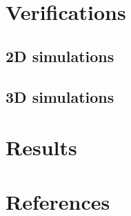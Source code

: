\documentclass[a4paper]{article}
\begin{document}
\section{Verifications}

\subsection{2D simulations}

\subsection{3D simulations}

\section{Results}

\section{References}
\printbibliography
\end{document}
